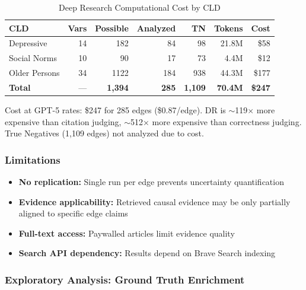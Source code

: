 \begin{table}[H]
\centering
\caption{Deep Research Computational Cost by CLD}
\label{tab:dr_cost}
\footnotesize
\begin{tabular}{@{}l r r r r r r@{}}
\toprule
\textbf{CLD} & \textbf{Vars} & \textbf{Possible} & \textbf{Analyzed} & \textbf{TN} & \textbf{Tokens} & \textbf{Cost} \\
\midrule
Depressive & 14 & 182 & 84 & 98 & 21.8M & \$58 \\
Social Norms & 10 & 90 & 17 & 73 & 4.4M & \$12 \\
Older Persons & 34 & 1122 & 184 & 938 & 44.3M & \$177 \\
\midrule
\textbf{Total} & --- & \textbf{1,394} & \textbf{285} & \textbf{1,109} & \textbf{70.4M} & \textbf{\$247} \\
\bottomrule
\end{tabular}
\end{table}

Cost at GPT-5 rates: \$247 for 285 edges (\$0.87/edge). DR is $\sim$119$\times$ more expensive than citation judging, $\sim$512$\times$ more expensive than correctness judging. True Negatives (1,109 edges) not analyzed due to cost.

\subsubsection{Limitations}

\begin{itemize}[noitemsep]
    \item \textbf{No replication:} Single run per edge prevents uncertainty quantification
    \item \textbf{Evidence applicability:} Retrieved causal evidence may be only partially aligned to specific edge claims
    \item \textbf{Full-text access:} Paywalled articles limit evidence quality
    \item \textbf{Search API dependency:} Results depend on Brave Search indexing
\end{itemize}

\subsubsection{Exploratory Analysis: Ground Truth Enrichment}
\label{sec:gt_enrichment_method}

